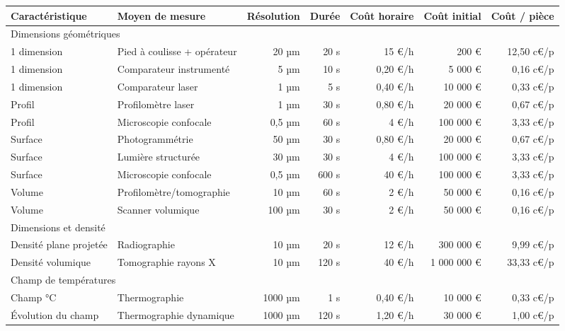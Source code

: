 \begin{table}[h!]
	\hspace*{-1,5cm}
	\begin{tabular}{|l|l|r|r|r|r|r|}
		\arrayrulecolor{black}
		\hline
		Caractéristique & Moyen de mesure & Résolution & Durée & Coût horaire & Coût initial & Coût / pièce \\ \hline
		\hline
		\multicolumn{7}{|l|}{Dimensions géométriques} \\ \hline
		1 dimension & Pied à coulisse + opérateur & 20 µm & 20 s & 15 €/h & 200 € & 12,50 c€/p \\ \hline
		1 dimension & Comparateur instrumenté & 5 µm & 10 s & 0,20 €/h & 5 000 € & 0,16 c€/p \\ \hline
		1 dimension & Comparateur laser & 1 µm & 5 s & 0,40 €/h & 10 000 € & 0,33 c€/p \\ \hline
		\hline
		Profil & Profilomètre laser & 1 µm & 30 s & 0,80 €/h & 20 000 € & 0,67 c€/p \\ \hline
		Profil & Microscopie confocale & 0,5 µm & 60 s & 4 €/h & 100 000 € & 3,33 c€/p \\ \hline
		\hline
		Surface & Photogrammétrie & 50 µm & 30 s & 0,80 €/h & 20 000 € & 0,67 c€/p \\ \hline
		Surface & Lumière structurée & 30 µm & 30 s & 4 €/h & 100 000 € & 3,33 c€/p \\ \hline  %
		Surface & Microscopie confocale & 0,5 µm & 600 s & 40 €/h & 100 000 € & 3,33 c€/p \\ \hline
		\hline
		Volume & Profilomètre/tomographie & 10 µm & 60 s & 2 €/h & 50 000 € & 0,16 c€/p \\ \hline
		Volume & Scanner volumique & 100 µm & 30 s & 2 €/h & 50 000 € & 0,16 c€/p \\ \hline
		\hline
		\multicolumn{7}{|l|}{Dimensions et densité} \\ \hline
		Densité plane projetée & Radiographie & 10 µm & 20 s & 12 €/h & 300 000 € & 9,99 c€/p \\ \hline
		Densité volumique & Tomographie rayons X & 10 µm & 120 s & 40 €/h & 1 000 000 € & 33,33 c€/p \\ \hline
		\hline
		\multicolumn{7}{|l|}{Champ de températures} \\ \hline
		Champ °C & Thermographie & 1000 µm & 1 s & 0,40 €/h & 10 000 € & 0,33 c€/p \\ \hline
		Évolution du champ & Thermographie dynamique & 1000 µm & 120 s & 1,20 €/h & 30 000 € & 1,00 c€/p \\ \hline

\end{tabular}
\end{table}
